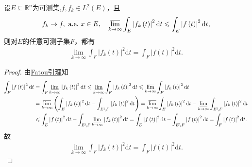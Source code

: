\documentclass[../../main.tex]{subfiles}%
\begin{document}
\begin{proposition}\label{proposition:Fatou引理的应用11}
设$E\subseteq \mathbb{R}^n$为可测集,$f,f_k\in L^2\left( E \right)$，且
\begin{align*}
f_k\rightarrow f,\ \mathrm{a.e.}\ x\in E,\quad \varlimsup\limits_{k\rightarrow \infty}\int_E{\left| f_k\left( t \right) \right|^2\mathrm{d}t}\leqslant \int_E{\left| f\left( t \right) \right|^2\mathrm{d}t},
\end{align*}
则对$E$的任意可测子集$F$，都有
\begin{align*}
\lim\limits_{k\rightarrow \infty}\int_F{\left| f_k\left( t \right) \right|^2\mathrm{d}t}=\int_F{\left| f\left( t \right) \right|^2\mathrm{d}t}.
\end{align*}
\end{proposition}
\begin{proof}

由\hyperref[theorem:Fatou引理]{Fatou引理}知
\begin{align*}
\int_F{\left| f\left( t \right) \right|^2\mathrm{d}t}&=\int_F{\varliminf\limits_{k\rightarrow \infty}\left| f_k\left( t \right) \right|^2\mathrm{d}t}\leqslant \varliminf\limits_{k\rightarrow \infty}\int_F{\left| f_k\left( t \right) \right|^2\mathrm{d}t}\leqslant \varlimsup\limits_{k\rightarrow \infty}\int_F{\left| f_k\left( t \right) \right|^2\mathrm{d}t}\\
&=\varlimsup\limits_{k\rightarrow \infty}\left( \int_E{\left| f_k\left( t \right) \right|^2\mathrm{d}t}-\int_{E\setminus F}{\left| f_k\left( t \right) \right|^2\mathrm{d}t} \right) =\varlimsup\limits_{k\rightarrow \infty}\int_E{\left| f_k\left( t \right) \right|^2\mathrm{d}t}-\varliminf\limits_{k\rightarrow \infty}\int_{E\setminus F}{\left| f_k\left( t \right) \right|^2\mathrm{d}t}\\
&\leqslant \int_E{\left| f\left( t \right) \right|^2\mathrm{d}t}-\int_{E\setminus F}{\varliminf\limits_{k\rightarrow \infty}\left| f_k\left( t \right) \right|^2\mathrm{d}t}=\int_E{\left| f\left( t \right) \right|^2\mathrm{d}t}-\int_{E\setminus F}{\left| f\left( t \right) \right|^2\mathrm{d}t}=\int_F{\left| f\left( t \right) \right|^2\mathrm{d}t}.
\end{align*}
故
\begin{align*}
\lim\limits_{k\rightarrow \infty}\int_F{\left| f_k\left( t \right) \right|^2\mathrm{d}t}=\int_F{\left| f\left( t \right) \right|^2\mathrm{d}t}.
\end{align*}

\end{proof}
\end{document}
